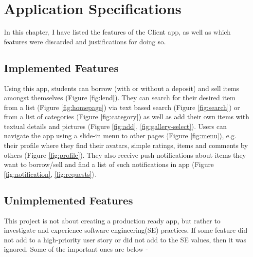 \chapter{Application Specifications}

In this chapter, I have listed the features of the Client app, as well as which features were discarded and justifications for doing so.

\section{Implemented Features}

Using this app, students can borrow (with or without a deposit) and sell items amongst themselves (Figure \ref{fig:lend}). They can search for their desired item from a list (Figure \ref{fig:homepage}) via text based search (Figure \ref{fig:search}) or from a list of categories (Figure \ref{fig:category}) as well as add their own items with textual details and pictures (Figure \ref{fig:add}, \ref{fig:gallery-select}). Users can navigate the app using a slide-in menu to other pages (Figure \ref{fig:menu}), e.g. their profile where they find their avatars, simple ratings, items and comments by others (Figure \ref{fig:profile}). They also receive push notifications about items they want to borrow/sell and find a list of such notifications in app (Figure \ref{fig:notification}, \ref{fig:requests}).

\section{Unimplemented Features}

This project is not about creating a production ready app, but rather to investigate and experience software engineering(SE) practices. If some feature did not add to a high-priority user story or did not add to the SE values, then it was ignored. Some of the important ones are below - 

